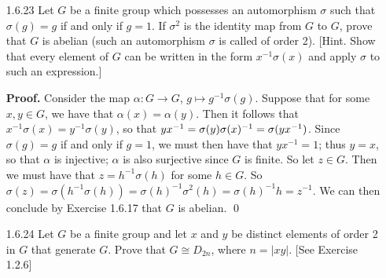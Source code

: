 \begin{enumerate}
      \textbf{Proof.} Let $k$ be an integer, $x, y \in A$. Consider the map
      $f : A \rightarrow A$, $a \mapsto a^k$. Since $A$ is abelian, it follows
      by definition and Exercise 1.1.24 that
      $f(xy) = (xy)^k = x^ky^k = f(x)f(y)$, so that $f$ is a homomorphism. Now 
      assume that $k = -1$. In this case, notice that the map $f$ is its own
      2-sided inverse; thus $f$ is bijective, so that $f$ is an isomorphism.
      \qed
   \item[1.6.23]  Let $G$ be a finite group which possesses an automorphism
                  $\sigma$ such that $\sigma(g) = g$ if and only if $g = 1$. If
                  $\sigma^2$ is the identity map from $G$ to $G$, prove that $G$
                  is abelian (such an automorphism $\sigma$ is called
                   of order 2). [Hint. Show that every
                  element of $G$ can be written in the form $x^{-1}\sigma(x)$
                  and apply $\sigma$ to such an expression.]

      \textbf{Proof.} Consider the map $\alpha : G \rightarrow G$,
      $g \mapsto g^{-1}\sigma(g)$. Suppose that for some $x, y \in G$, we have
      that $\alpha(x) = \alpha(y)$. Then it follows that
      $x^{-1}\sigma(x) = y^{-1}\sigma(y)$, so that
      $yx^{-1} =\nobreak \sigma(y)\sigma(x)^{-1} = \sigma(yx^{-1})$. Since
      $\sigma(g) = g$ if and only if $g = 1$, we must then have that
      $yx^{-1} = 1$; thus $y = x$, so that $\alpha$ is injective; $\alpha$ is
      also surjective since $G$ is finite. So let $z \in G$. Then we must have 
      that $z = h^{-1}\sigma(h)$ for some $h \in G$. So
      $\sigma(z) = \sigma(h^{-1}\sigma(h)) = \sigma(h)^{-1}\sigma^2(h) =
       \sigma(h)^{-1}h = z^{-1}$. We can then conclude by Exercise 1.6.17 that
      $G$ is abelian. \qed
   \item[1.6.24]  Let $G$ be a finite group and let $x$ and $y$ be distinct
                  elements of order 2 in $G$ that generate $G$. Prove that
                  $G \cong D_{2n}$, where $n = |xy|$. [See Exercise 1.2.6]
                  

\end{enumerate}
